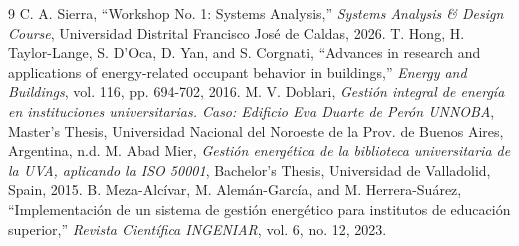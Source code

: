 \documentclass[12pt,a4paper]{article}
\begin{document}
\newpage
\begin{thebibliography}{9}
 C. A. Sierra, ``Workshop No. 1: Systems Analysis,'' \textit{Systems Analysis \& Design Course}, Universidad Distrital Francisco José de Caldas, 2026.
 T. Hong, H. Taylor-Lange, S. D'Oca, D. Yan, and S. Corgnati, ``Advances in research and applications of energy-related occupant behavior in buildings,'' \textit{Energy and Buildings}, vol. 116, pp. 694-702, 2016.
 M. V. Doblari, \textit{Gestión integral de energía en instituciones universitarias. Caso: Edificio Eva Duarte de Perón UNNOBA}, Master's Thesis, Universidad Nacional del Noroeste de la Prov. de Buenos Aires, Argentina, n.d.
 M. Abad Mier, \textit{Gestión energética de la biblioteca universitaria de la UVA, aplicando la ISO 50001}, Bachelor's Thesis, Universidad de Valladolid, Spain, 2015.
 B. Meza-Alcívar, M. Alemán-García, and M. Herrera-Suárez, ``Implementación de un sistema de gestión energético para institutos de educación superior,'' \textit{Revista Científica INGENIAR}, vol. 6, no. 12, 2023.
\end{thebibliography}
\end{document}

